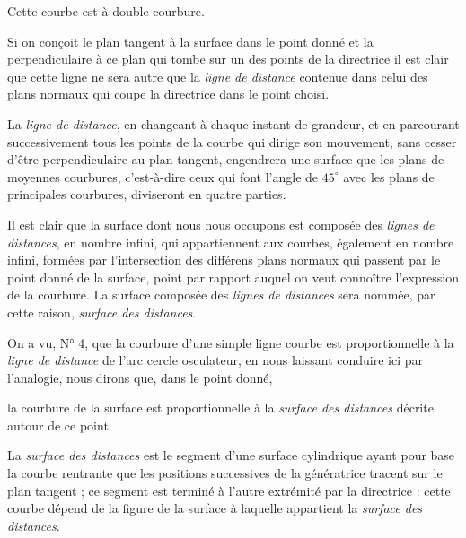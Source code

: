 \documentclass[11pt,a4paper]{article}
\begin{document}

Cette courbe est à double courbure.

Si on conçoit le plan tangent à la surface dans le point donné et la
perpendiculaire à ce plan qui tombe sur un des points de la directrice il
est clair que cette ligne ne sera autre que la \emph{ligne de distance}
contenue dans celui des plans normaux qui coupe la directrice dans le point
choisi.

La \emph{ligne de distance}, en changeant à chaque instant de grandeur, et
en parcourant successivement tous les points de la courbe qui dirige son
mouvement, sans cesser d'être perpendiculaire au plan tangent, engendrera
une surface que les plans de moyennes courbures, c'est-à-dire ceux qui font
l'angle de $45^{\circ}$ avec les plans de principales courbures, diviseront
en quatre parties.

Il est clair que la surface dont nous nous occupons est composée des
\emph{lignes de distances}, en nombre infini, qui appartiennent aux courbes,
également en nombre infini, formées par l'intersection des différens plans
normaux qui passent par le point donné de la surface, point par rapport
auquel on veut connoître l'expression de la courbure. La surface composée
des \emph{lignes de distances} sera nommée, par cette raison, \emph{surface
des distances}.

On a vu, N° 4, que la courbure d'une simple ligne courbe est proportionnelle
à la \emph{ligne de distance} de l'arc \ill{} cercle osculateur, en nous
laissant conduire ici par l'analogie, nous dirons que, dans le point donné,


la courbure de la surface est proportionnelle à la \emph{surface des
distances} décrite autour de ce point.

La \emph{surface des distances} est le segment d'une surface cylindrique
ayant pour base  la courbe rentrante que les positions
successives de la génératrice tracent sur le plan tangent ; ce segment est
terminé à l'autre extrémité par la directrice :  cette
courbe dépend de la figure de la surface à laquelle appartient la
\emph{surface des distances}.

\end{document}
